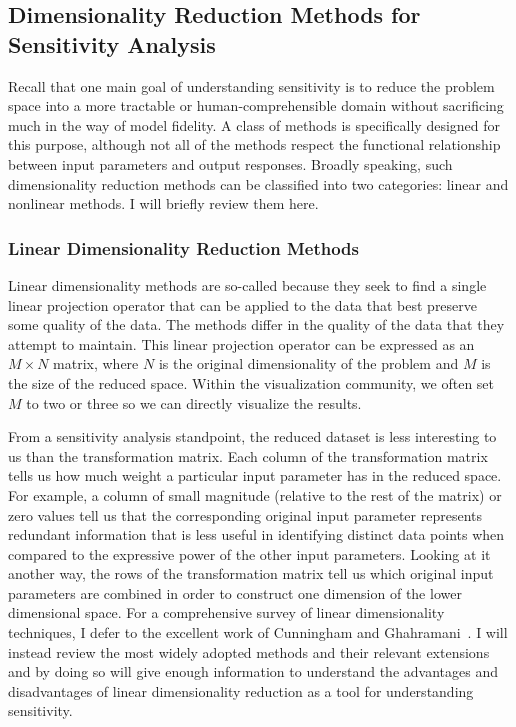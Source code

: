 \subsection{Dimensionality Reduction Methods for\\Sensitivity Analysis}

Recall that one main goal of understanding sensitivity is to reduce the problem space into a more tractable or human-comprehensible domain without sacrificing much in the way of model fidelity.
%
A class of methods is specifically designed for this purpose, although not all of the methods respect the functional relationship between input parameters and output responses.
%
Broadly speaking, such dimensionality reduction methods can be classified into two categories: linear and nonlinear methods.
%
I will briefly review them here.

\subsubsection{Linear Dimensionality Reduction Methods}

Linear dimensionality methods are so-called because they seek to find a single linear projection operator that can be applied to the data that best preserve some quality of the data.
%
The methods differ in the quality of the data that they attempt to maintain.
%
This linear projection operator can be expressed as an $M \times N$ matrix, where $N$ is the original dimensionality of the problem and $M$ is the size of the reduced space.
%
Within the visualization community, we often set $M$ to two or three so we can directly visualize the results.

From a sensitivity analysis standpoint, the reduced dataset is less interesting to us than the transformation matrix.
%
Each column of the transformation matrix tells us how much weight a particular input parameter has in the reduced space.
%
For example, a column of small magnitude (relative to the rest of the matrix) or zero values tell us that the corresponding original input parameter represents redundant information that is less useful in identifying distinct data points when compared to the expressive power of the other input parameters.
%
Looking at it another way, the rows of the transformation matrix tell us which original input parameters are combined in order to construct one dimension of the lower dimensional space.
%
For a comprehensive survey of linear dimensionality techniques, I defer to the excellent work of Cunningham and Ghahramani~\cite{CunninghamGhahramani2015}.
%
I will instead review the most widely adopted methods and their relevant extensions and by doing so will give enough information to understand the advantages and disadvantages of linear dimensionality reduction as a tool for understanding sensitivity.

